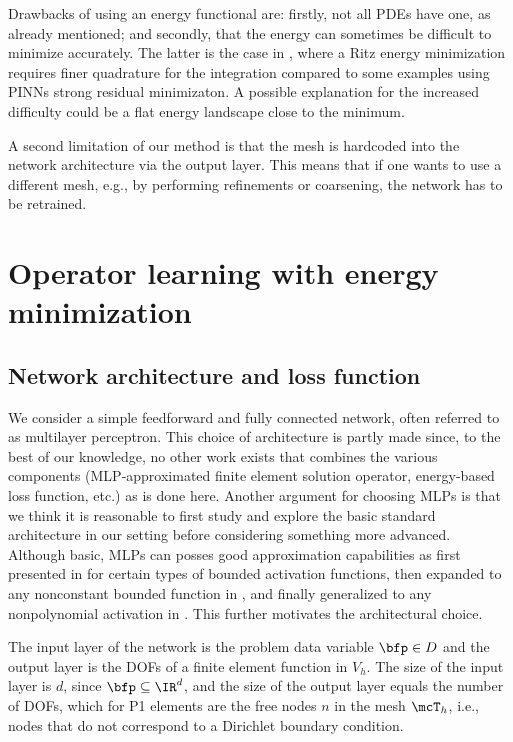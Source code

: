 \documentclass[12pt]{article}
\begin{document}
Drawbacks of using an energy functional are: firstly, not all PDEs have one, as already mentioned; and secondly, that the energy can sometimes be difficult to minimize accurately. The latter is the case in \cite{muller23b}, where a Ritz energy minimization requires finer quadrature for the integration compared to some examples using PINNs strong residual minimizaton. A possible explanation for the increased difficulty could be a flat energy landscape close to the minimum.

A second limitation of our method is that the mesh is hardcoded into the network architecture via the output layer. This means that if one wants to use a different mesh, e.g., by performing refinements or coarsening, the network has to be retrained.

\section{Operator learning with energy minimization}\label{sec:learning}

\subsection{Network architecture and loss function}\label{subsec:archloss}
We consider a simple feedforward and fully connected network, often referred to as multilayer perceptron. This choice of architecture is partly made since, to the best of our knowledge, no other work exists that combines the various components (MLP-approximated finite element solution operator, energy-based loss function, etc.) as is done here. Another argument for choosing MLPs is that we think it is reasonable to first study and explore the basic standard architecture in our setting before considering something more advanced. Although basic, MLPs can posses good approximation capabilities as first presented in \cite{cybenko_1989, hornik_multilayer_1989} for certain types of bounded activation functions, then expanded to any nonconstant bounded function in \cite{HORNIK1991251}, and finally generalized to any nonpolynomial activation in \cite{LESHNO1993861}. This further motivates the architectural choice.

The input layer of the network is the problem data variable $\bfp \in D$ and the output layer is the DOFs of a finite element function in $V_h$. The size of the input layer is $d$, since $\bfp \subseteq \IR^d$, and the size of the output layer equals the number of DOFs, which for P1 elements are the free nodes $n$ in the mesh $\mcT_h$, i.e., nodes that do not correspond to a Dirichlet boundary condition.
\end{document}
